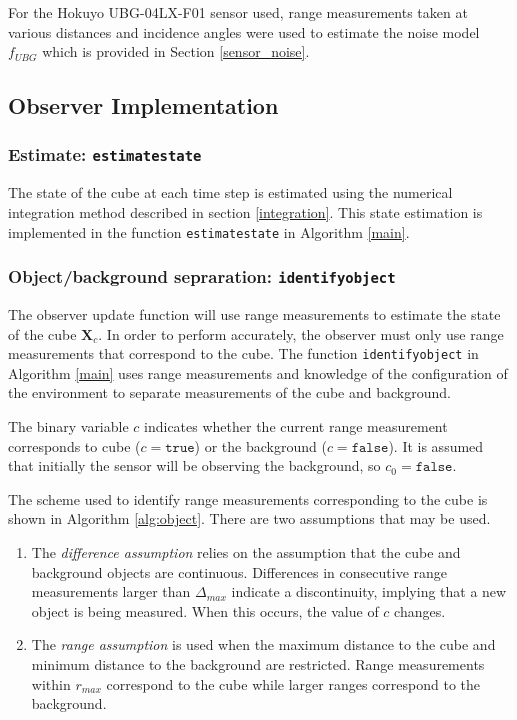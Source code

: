 	For the Hokuyo UBG-04LX-F01 sensor used, range measurements taken at various distances and incidence angles were used to estimate the noise model $f_{UBG}$ which is provided in Section \ref{sensor_noise}.
	
\subsection{Observer Implementation}

	\subsubsection{Estimate: \texttt{estimatestate}}
		The state of the cube at each time step is estimated using the numerical integration method described in section \ref{integration}. This state estimation is implemented in the function \texttt{estimatestate} in Algorithm \ref{main}.
	
	\subsubsection{Object/background sepraration: \texttt{identifyobject}}
		The observer update function will use range measurements to estimate the state of the cube $\mathbf{X}_c$. In order to perform accurately, the observer must only use range measurements that correspond to the cube. The function \texttt{identifyobject} in Algorithm \ref{main} uses range measurements and knowledge of the configuration of the environment to separate measurements of the cube and background.
		
		The binary variable $c$ indicates whether the current range measurement corresponds to cube ($c=\texttt{true}$) or the background ($c=\texttt{false}$). It is assumed that initially the sensor will be observing the background, so $c_0=\texttt{false}$.

		The scheme used to identify range measurements corresponding to the cube is shown in Algorithm \ref{alg:object}. There are two assumptions that may be used.
		\begin{enumerate}
		\item The \textit{difference assumption} relies on the assumption that the cube and background objects are continuous. Differences in consecutive range measurements larger than $\Delta_{max}$ indicate a discontinuity, implying that a new object is being measured. When this occurs, the value of $c$ changes.
		\item The \textit{range assumption} is used when the maximum distance to the cube and minimum distance to the background are restricted. Range measurements within $r_{max}$ correspond to the cube while larger ranges correspond to the background.
		\end{enumerate}
		
